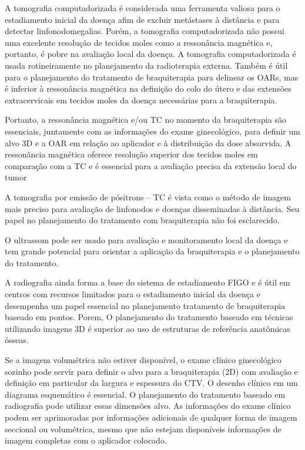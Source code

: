 \documentclass[11pt,a4paper]{article}
\newcounter{exemplo}
\begin{document}
\begin{exemplo}
\begin{itemize}[label=\textcolor{CarnationPink}{$\blacksquare$}]
			
			A tomografia computadorizada é considerada uma ferramenta valiosa para o estadiamento inicial da doença afim de excluir metástases à distância e para detectar linfonodomegalias. Porém, a tomografia computadorizada não possui uma excelente resolução de tecidos moles como a ressonância magnética e, portanto, é pobre na avaliação local da doença. A tomografia computadorizada é usada rotineiramente no planejamento da radioterapia externa. Também é útil para o planejamento do tratamento de braquiterapia para delinear os OARs, mas é inferior à ressonância magnética na definição do colo do útero e das extensões extracervicais em tecidos moles da doença necessárias para a braquiterapia.

			Portanto, a ressonância magnética e/ou TC no momento da braquiterapia são essenciais, juntamente com as informações do exame ginecológico, para definir um alvo 3D e a OAR em relação ao aplicador e à distribuição da dose absorvida. A ressonância magnética oferece resolução superior dos tecidos moles em comparação com a TC e é essencial para a avaliação precisa da extensão local do tumor

			A tomografia por emissão de pósitrons – TC é vista como o método de imagem mais preciso para avaliação de linfonodos e doenças disseminadas à distância. Seu papel no planejamento do tratamento com braquiterapia não foi esclarecido.

			O ultrassom pode ser usado para avaliação e monitoramento local da doença e tem grande potencial para orientar a aplicação da braquiterapia e o planejamento do tratamento.

			A radiografia ainda forma a base do sistema de estadiamento FIGO e é útil em centros com recursos limitados para o estadiamento inicial da doença e desempenha um papel essencial no planejamento tratamento de braquiterapia baseado em pontos. Porem, O planejamento do tratamento baseado em técnicas utilizando imagens 3D é superior ao uso de estruturas de referência anatômicas ósseas.

			Se a imagem volumétrica não estiver disponível, o exame clínico ginecológico sozinho pode servir para definir o alvo para a braquiterapia (2D) com avaliação e definição em particular da largura e espessura do CTV. O desenho clínico em um diagrama esquemático é essencial. O planejamento do tratamento baseado em radiografia pode utilizar essas dimensões alvo. As informações do exame clínico podem ser aprimoradas por informações adicionais de qualquer forma de imagem seccional ou volumétrica, mesmo que não estejam disponíveis informações de imagem completas com o aplicador colocado.
		\end{itemize}
	\end{exemplo}
\end{document}
